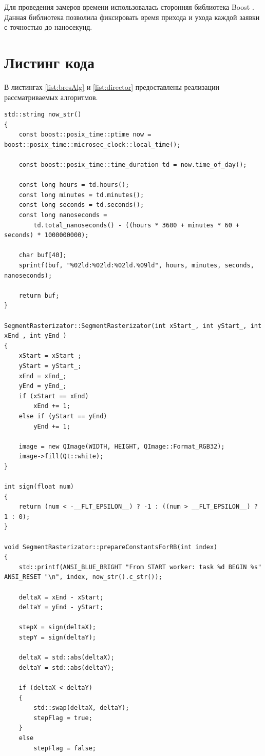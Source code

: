 \documentclass[12pt]{report}
\begin{document}
Для проведения замеров времени использовалась сторонняя библиотека Boost \cite{Boost}. Данная библиотека позволила фиксировать время прихода и ухода каждой заявки с точностью до наносекунд.

\section{Листинг кода}
В листингах \ref{list:bresAlg} и \ref{list:director} предоставлены реализации рассматриваемых алгоритмов.
\begin{lstlisting}[caption=Разбиение алгоритма Брезенхема,
label={list:bresAlg}]
std::string now_str()
{
    const boost::posix_time::ptime now = boost::posix_time::microsec_clock::local_time();

    const boost::posix_time::time_duration td = now.time_of_day();

    const long hours = td.hours();
    const long minutes = td.minutes();
    const long seconds = td.seconds();
    const long nanoseconds =
        td.total_nanoseconds() - ((hours * 3600 + minutes * 60 + seconds) * 1000000000);

    char buf[40];
    sprintf(buf, "%02ld:%02ld:%02ld.%09ld", hours, minutes, seconds, nanoseconds);

    return buf;
}

SegmentRasterizator::SegmentRasterizator(int xStart_, int yStart_, int xEnd_, int yEnd_)
{
    xStart = xStart_;
    yStart = yStart_;
    xEnd = xEnd_;
    yEnd = yEnd_;
    if (xStart == xEnd)
        xEnd += 1;
    else if (yStart == yEnd)
        yEnd += 1;

    image = new QImage(WIDTH, HEIGHT, QImage::Format_RGB32);
    image->fill(Qt::white);
}

int sign(float num)
{
    return (num < -__FLT_EPSILON__) ? -1 : ((num > __FLT_EPSILON__) ? 1 : 0);
}

void SegmentRasterizator::prepareConstantsForRB(int index)
{
    std::printf(ANSI_BLUE_BRIGHT "From START worker: task %d BEGIN %s" ANSI_RESET "\n", index, now_str().c_str());

    deltaX = xEnd - xStart;
    deltaY = yEnd - yStart;

    stepX = sign(deltaX);
    stepY = sign(deltaY);

    deltaX = std::abs(deltaX);
    deltaY = std::abs(deltaY);

    if (deltaX < deltaY)
    {
        std::swap(deltaX, deltaY);
        stepFlag = true;
    }
    else
        stepFlag = false;


\end{lstlisting}
\end{document}
